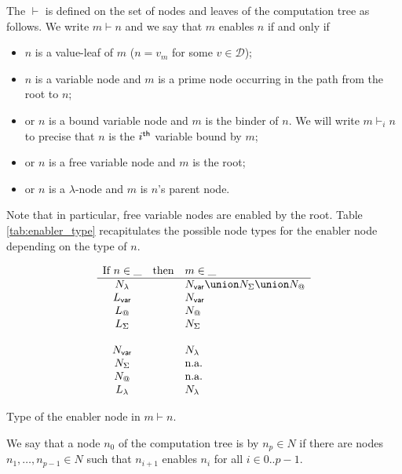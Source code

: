 \begin{definition}[Enabling]
The  $\vdash$ is defined on the set of
nodes and leaves of the computation tree as follows. We write $m \vdash n$ and
we say that $m$ enables $n$ if and only if
\begin{itemize}
\item $n$ is a value-leaf of $m$ ($n=v_m$ for some $v\in\mathcal{D}$);
\item $n$ is a variable node and $m$ is a prime node occurring in the path from the root to $n$;
\item or $n$ is a bound variable node and $m$ is the binder of $n$. We will write $m \vdash_i n$ to precise that $n$
is the $i^{\sf th}$ variable bound by $m$;
\item or $n$ is a free variable node and $m$ is the root;
\item or $n$ is a $\lambda$-node and $m$ is $n$'s parent node.
\end{itemize}
Note that in particular, free variable nodes are enabled by the root.
Table \ref{tab:enabler_type} recapitulates the possible node types for the enabler node
depending on the type of $n$.
\end{definition}


\begin{table}[htbp]
$$
\begin{array}{ccl}
\mbox{If } n\in \_  & \mbox{then} & m\in \_ \\ \hline
N_\lambda & & N_{\sf var} \union N_\Sigma \union N_@ \\
L_{\sf var} & & N_{\sf var} \\
L_@ & &  N_@ \\
L_\Sigma & & N_\Sigma\\
\\
N_{\sf var} & & N_\lambda\\
N_\Sigma & & \mbox{n.a.} \\
N_@ & & \mbox{n.a.} \\
L_\lambda & & N_\lambda\\
\end{array}
$$
\caption[Type of the justifying node]{Type of the enabler node in $m\vdash n$.}
\label{tab:enabler_type}
\end{table}

We say that a node $n_0$ of the computation tree is  by $n_p \in N$ if there are nodes $n_1,\ldots, n_{p-1} \in N$ such that $n_{i+1}$ enables $n_{i}$
for all $i\in 0..p-1$.

